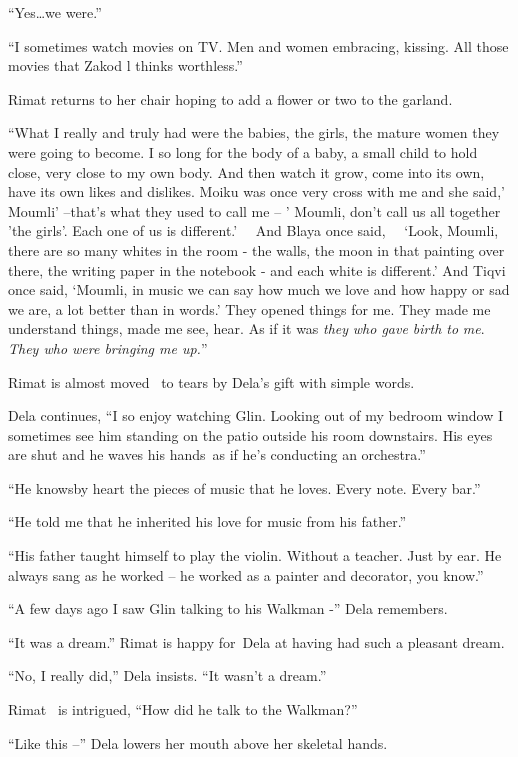 \documentclass[twoside,11pt]{book}
\begin{document}
``Yes{\dots}we were.''

``I sometimes watch movies on TV. Men and women embracing, kissing. All those movies that Zakod l thinks
worthless.''

Rimat returns to her chair hoping to add a flower or two to the garland.

``What I really and truly had were the babies, the girls, the mature women they were going to become. I so
long for the body of a baby, a small child to hold close, very close to my own body. And then watch it grow, come into
its own, have its own likes and dislikes. Moiku was once very cross with me and she said,' Moumli' --that's what they
used to call me -- ' Moumli, don't call us all together 'the girls'. Each one of us is different.' \ \ And Blaya once
said, \ \ {}`Look, Moumli, there are so many whites in the room - the walls, the moon in that painting over there, the
writing paper in the notebook - and each white is different.' And Tiqvi once said, `Moumli, in music we can say how
much we love and how happy or sad we are, a lot better than in words.' They opened things for me. They made me
understand things, made me see, hear. As if it was \textit{they} \textit{who gave birth to} \textit{me}.\textit{ They
who were bringing me up.}''

Rimat is almost moved \ to tears by Dela's gift with simple words.

Dela continues, ``I so enjoy watching Glin. Looking out of my bedroom window I sometimes see him standing
on the patio outside his room downstairs. His eyes are shut and he waves his hands~as if he's conducting an
orchestra.''

``He knowsby heart the pieces of music that he loves. Every note. Every bar.''

``He told me that he inherited his love for music from his father.''

``His father taught himself to play the violin. Without a teacher. Just by ear. He always sang as he worked
-- he worked as a painter and decorator, you know.''

``A few days ago I saw Glin talking to his Walkman -'' Dela remembers.

``It was a dream.'' Rimat is happy for~Dela at having had such a pleasant dream.

``No, I really did,'' Dela insists. ``It wasn't a dream.''

Rimat ~is intrigued, ``How did he talk to the Walkman?''

``Like this --'' Dela lowers her mouth above her skeletal hands.
\end{document}
